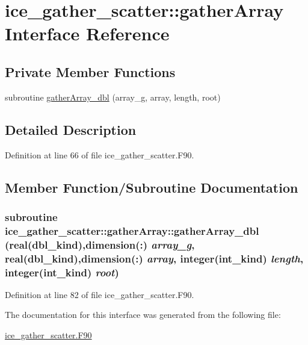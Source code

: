 \hypertarget{interfaceice__gather__scatter_1_1gatherArray}{
\section{ice\_\-gather\_\-scatter::gatherArray Interface Reference}
\label{interfaceice__gather__scatter_1_1gatherArray}
}
\subsection*{Private Member Functions}
\begin{DoxyCompactItemize}
\item 
subroutine \hyperlink{interfaceice__gather__scatter_1_1gatherArray_a05d05657af12e522eea60fae83740547}{gatherArray\_\-dbl} (array\_\-g, array, length, root)
\end{DoxyCompactItemize}


\subsection{Detailed Description}


Definition at line 66 of file ice\_\-gather\_\-scatter.F90.

\subsection{Member Function/Subroutine Documentation}
\hypertarget{interfaceice__gather__scatter_1_1gatherArray_a05d05657af12e522eea60fae83740547}{
\subsubsection[{gatherArray\_\-dbl}]{\setlength{\rightskip}{0pt plus 5cm}subroutine ice\_\-gather\_\-scatter::gatherArray::gatherArray\_\-dbl (real(dbl\_\-kind),dimension(:) {\em array\_\-g}, \/  real(dbl\_\-kind),dimension(:) {\em array}, \/  integer(int\_\-kind) {\em length}, \/  integer(int\_\-kind) {\em root})}}
\label{interfaceice__gather__scatter_1_1gatherArray_a05d05657af12e522eea60fae83740547}


Definition at line 82 of file ice\_\-gather\_\-scatter.F90.

The documentation for this interface was generated from the following file:\begin{DoxyCompactItemize}
\item 
\hyperlink{ice__gather__scatter_8F90}{ice\_\-gather\_\-scatter.F90}\end{DoxyCompactItemize}
